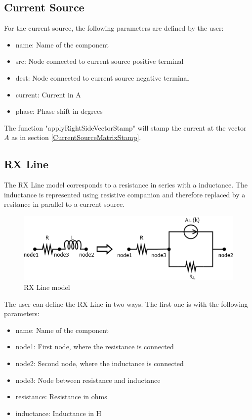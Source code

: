 \subsection{Current Source}

For the current source, the following parameters are defined by the user:

\begin{itemize}
\item name: Name of the component
\item src: Node connected to current source positive terminal
\item dest: Node connected to current source negative terminal
\item current: Current in A
\item phase: Phase shift in degrees
\end{itemize}

The function "applyRightSideVectorStamp" will stamp the current at the vector $A$ as in section \ref{CurrentSourceMatrixStamp}.

\subsection{RX Line}
The RX Line model corresponds to a resistance in series with a inductance. The inductance is represented using resistive companion and therefore replaced by a resitance in parallel to a current source.

\begin{figure}[ht]
	\centering
	\includegraphics[scale=0.5]{img/RxLine.png} 
	\caption{RX Line model}
	\label{fig:RxLine}
\end{figure}

The user can define the RX Line in two ways. The first one is with the following parameters:

\begin{itemize}
\item name: Name of the component
\item node1: First node, where the resistance is connected
\item node2: Second node, where the inductance is connected
\item node3: Node between resistance and inductance 
\item resistance: Resistance in ohms
\item inductance: Inductance in H
\end{itemize}

